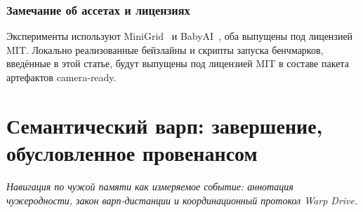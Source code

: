 \documentclass{article}
\begin{document}
\section{Замечание об ассетах и лицензиях}
\label{p1:app:assets}

Эксперименты используют MiniGrid~\citep{MinigridMiniworld23} и BabyAI~\citep{chevalier2018babyai}, оба выпущены под лицензией MIT. Локально реализованные бейзлайны и скрипты запуска бенчмарков, введённые в этой статье, будут выпущены под лицензией MIT в составе пакета артефактов camera-ready.

\clearpage
\FloatBarrier
\FloatBarrier

\clearpage
\part{Семантический варп: завершение, обусловленное провенансом}
\noindent\textit{Навигация по чужой памяти как измеряемое событие: аннотация чужеродности, закон варп-дистанции и координационный протокол Warp Drive.}
\end{document}
